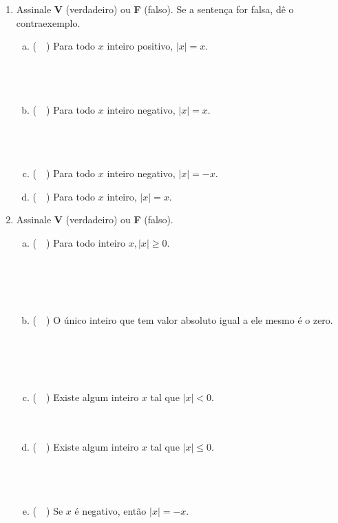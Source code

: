 \documentclass[a4paper,14pt]{article}
\begin{document}
\begin{multicols}{2}
\begin{enumerate}
\begin{enumerate}[a)]
			\end{enumerate}
			\item Assinale \textbf{V} (verdadeiro) ou \textbf{F} (falso). Se a sentença for falsa, dê o contraexemplo.
			\begin{enumerate}[a)]
				\item (~~) Para todo $x$ inteiro positivo, $|x| = x$. \\\\\\\\
				\item (~~) Para todo $x$ inteiro negativo, $|x| = x$. \\\\\\\\
				\item (~~) Para todo $x$ inteiro negativo, $|x| = -x$.
				\item (~~) Para todo $x$ inteiro, $|x| = x$.
			\end{enumerate}
			\item Assinale \textbf{V} (verdadeiro) ou \textbf{F} (falso).
			\begin{enumerate}[a)]
				\item (~~) Para todo inteiro $x, |x| \geq 0$. \\\\\\\\\\
				\item (~~) O único inteiro que tem valor absoluto igual a ele mesmo é o zero. \\\\\\\\\\
				\item (~~) Existe algum inteiro $x$ tal que $|x| < 0$.
				 \\\\\\
				\item (~~) Existe algum inteiro $x$ tal que $|x| \leq 0$. \\\\\\\\
				\item (~~) Se $x$ é negativo, então $|x| = -x$. \\\\\\\\

\end{enumerate}
\end{enumerate}
\end{multicols}
\end{document}
